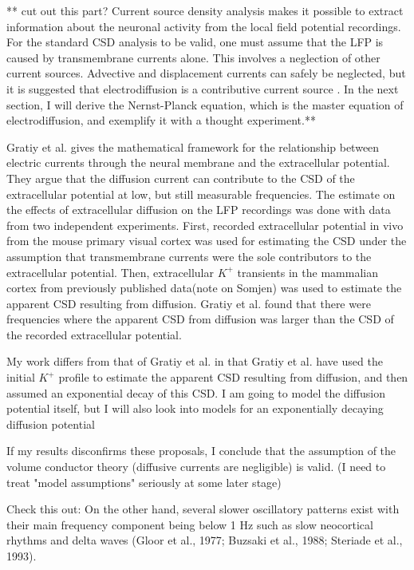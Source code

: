\documentclass{article}
\begin{document}
** cut out this part?
Current source density analysis makes it possible to extract information about the neuronal activity from the local field potential recordings. For the standard CSD analysis to be valid, one must assume that the LFP is caused by transmembrane currents alone. This involves a neglection of other current sources. Advective and displacement currents can safely be neglected, but it is suggested that electrodiffusion is a contributive current source \cite{Gratiy2017}. In the next section, I will derive the Nernst-Planck equation, which is the master equation of electrodiffusion, and exemplify it with a thought experiment.**

Gratiy et al.\cite{Gratiy2017} gives the mathematical framework for the relationship between electric currents through the neural membrane and the extracellular potential. They argue that the diffusion current can contribute to the CSD of the extracellular potential at low, but still measurable frequencies. The estimate on the effects of extracellular diffusion on the LFP recordings was done with data from two independent experiments. First, recorded extracellular potential in vivo from the mouse primary visual cortex was used for estimating the CSD under the assumption that transmembrane currents were the sole contributors to the extracellular potential. Then, extracellular $K^+$ transients in the mammalian cortex from previously published data(note on Somjen) was used to estimate the apparent CSD resulting from diffusion. Gratiy et al. found that there were frequencies where the apparent CSD from diffusion was larger than the CSD of the recorded extracellular potential.

 My work differs from that of Gratiy et al. in that Gratiy et al. have used the initial $K^+$ profile to estimate the apparent CSD resulting from diffusion, and then assumed an exponential decay of this CSD. I am going to model the diffusion potential itself, but I will also look into models for an exponentially decaying diffusion potential

If my results disconfirms these proposals, I conclude that the assumption of the volume conductor theory (diffusive currents are negligible) is valid. 
(I need to treat "model assumptions" seriously at some later stage)

Check this out: On the
other hand, several slower oscillatory patterns exist with their main
frequency component being below 1 Hz such as slow neocortical
rhythms and delta waves (Gloor et al., 1977; Buzsaki et al., 1988;
Steriade et al., 1993).
\end{document}
